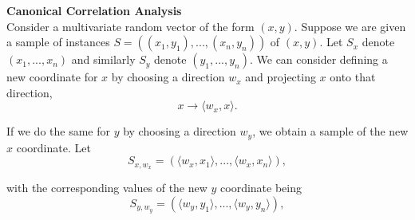 \documentclass[fleqn,a4paper,11pt]{article}
\begin{document}
\noindent \textbf{Canonical Correlation Analysis} \\


\noindent Consider a multivariate random vector of the form $(x, y)$. Suppose we
are given a sample of instances $S = ((x_{1}, y_{1}), . . . , (x_{n}, y_n))$ of $(x, y)$. Let $S_{x}$ denote $(x_{1},..., x_{n})$ and similarly $S_{y}$ denote $(y_1,..., y_	n)$. We can consider
defining a new coordinate for $x$ by choosing a direction $w_x$ and projecting $x$ onto that direction,
\begin{equation*}
x \rightarrow \langle w_x, x \rangle. 
\end{equation*}

\noindent If we do the same for $y$ by choosing a direction $w_y$, we obtain a sample of the new $x$ coordinate. Let
\begin{equation*}
S_{x,w_x} = ( \langle w_x, x_1 \rangle ,...,\langle w_x, x_n \rangle),
\end{equation*}

\noindent with the  corresponding values of the new $y$ coordinate being
\begin{equation*}
S_{y,w_y} = ( \langle w_y, y_1 \rangle ,...,\langle w_y, y_n \rangle),
\end{equation*}
\end{document}
